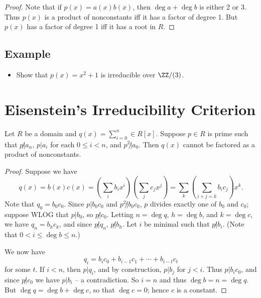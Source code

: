 \documentclass{article}
\begin{document}
\begin{proof}
Note that if $p(x) = a(x)b(x)$, then $\deg{a} + \deg{b}$ is either 2 or 3. Thus $p(x)$ is a product of nonconstants iff it has a factor of degree 1. But $p(x)$ has a factor of degree 1 iff it has a root in $R$.
\end{proof}

\subsection*{Example}

\begin{itemize}
\item Show that $p(x) = x^2 + 1$ is irreducible over $\ZZ/(3)$. 
\end{itemize}

\section{Eisenstein's Irreducibility Criterion}

\begin{prop}
Let $R$ be a domain and $q(x) = \sum_{i=0}^n \in R[x]$. Suppose $p \in R$ is prime such that $p \not| a_n$, $p|a_i$ for each $0 \leq i < n$, and $p^2 \not| a_0$. Then $q(x)$ cannot be factored as a product of nonconstants. 
\end{prop}

\begin{proof}
Suppose we have \[ q(x) = b(x)c(x) = \left(\sum_{i}b_ix^i\right)\left(\sum_{j}c_jx^j\right) = \sum_{k}\left( \sum_{i+j = k}b_ic_j \right)x^k. \] Note that $q_0 = b_0c_0$. Since $p | b_0c_0$ and $p^2 \not| b_0c_0$, $p$ divides exactly one of $b_0$ and $c_0$; suppose WLOG that $p|b_0$, so $p \not| c_0$. Letting $n = \deg{q}$, $h = \deg{b}$, and $k = \deg{c}$, we have $q_n = b_hc_k$, and since $p \not| q_n$, $p \not| b_h$. Let $i$ be minimal such that $p\not|b_i$. (Note that $0 < i \leq \deg{b} \leq n$.)

We now have \[ q_i = b_ic_0 + b_{i-1}c_1 + \cdots + b_{i-t}c_t \] for some $t$. If $i < n$, then $p|q_i$, and by construction, $p|b_j$ for $j < i$. Thus $p|b_ic_0$, and since $p \not| c_0$ we have $p|b_i$ -- a contradiction. So $i = n$ and thus $\deg{b} = n = \deg{q}$. But $\deg{q} = \deg{b} + \deg{c}$, so that $\deg{c} = 0$; hence $c$ is a constant.
\end{proof}
\end{document}
